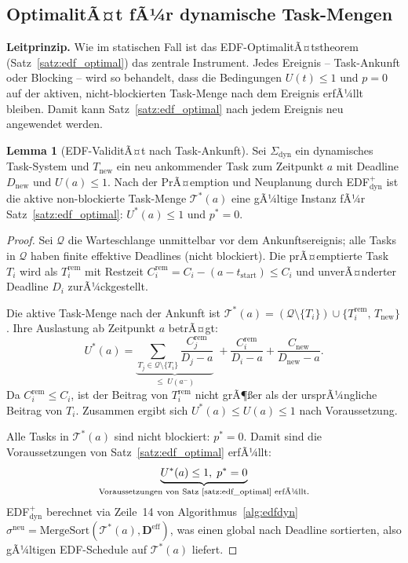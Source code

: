 ﻿\documentclass[a4paper,12pt]{article}
\theoremstyle{definition}
\newtheorem{lemma}{Lemma}
\begin{document}
	\subsection{OptimalitÃ¤t fÃ¼r dynamische Task-Mengen}

	\textbf{Leitprinzip.} Wie im statischen Fall ist das EDF-OptimalitÃ¤tstheorem
	(Satz~\ref{satz:edf_optimal}) das zentrale Instrument. Jedes Ereignis --
	Task-Ankunft oder Blocking -- wird so behandelt, dass die Bedingungen
	$U(t) \le 1$ und $p = 0$ auf der aktiven, nicht-blockierten Task-Menge
	nach dem Ereignis erfÃ¼llt bleiben. Damit kann Satz~\ref{satz:edf_optimal}
	nach jedem Ereignis neu angewendet werden.

	\begin{lemma}[EDF-ValiditÃ¤t nach Task-Ankunft]
		\label{lem:ankunft_konsistenz}
		Sei $\Sigma_{\mathrm{dyn}}$ ein dynamisches Task-System und $T_{\text{new}}$
		ein neu ankommender Task zum Zeitpunkt $a$ mit Deadline $D_{\text{new}}$
		und $U(a) \le 1$. Nach der PrÃ¤emption und Neuplanung durch
		EDF$^+_{\mathrm{dyn}}$ ist die aktive non-blockierte Task-Menge
		$\mathcal{T}^*(a)$ eine gÃ¼ltige Instanz fÃ¼r
		Satz~\ref{satz:edf_optimal}: $U^*(a) \le 1$ und $p^* = 0$.
	\end{lemma}

	\begin{proof}
		Sei $\mathcal{Q}$ die Warteschlange unmittelbar vor dem Ankunftsereignis;
		alle Tasks in $\mathcal{Q}$ haben finite effektive Deadlines (nicht blockiert).
		Die prÃ¤emptierte Task $T_i$ wird als $T_i^{\text{rem}}$ mit Restzeit
		$C_i^{\text{rem}} = C_i - (a - t_{\text{start}}) \le C_i$ und
		unverÃ¤nderter Deadline $D_i$ zurÃ¼ckgestellt.

		Die aktive Task-Menge nach der Ankunft ist
		$\mathcal{T}^*(a) = (\mathcal{Q} \setminus \{T_i\}) \cup \{T_i^{\text{rem}},\, T_{\text{new}}\}$.
		Ihre Auslastung ab Zeitpunkt $a$ betrÃ¤gt:
		\[
		U^*(a) = \underbrace{\sum_{T_j \in \mathcal{Q} \setminus \{T_i\}} \frac{C_j^{\text{rem}}}{D_j - a}}_{{\le}\; U(a^-)}\;
		+ \frac{C_i^{\text{rem}}}{D_i - a}
		+ \frac{C_{\text{new}}}{D_{\text{new}} - a}.
		\]
		Da $C_i^{\text{rem}} \le C_i$, ist der Beitrag von $T_i^{\text{rem}}$ nicht
		grÃ¶\ss{}er als der ursprÃ¼ngliche Beitrag von $T_i$. Zusammen ergibt sich
		$U^*(a) \le U(a) \le 1$ nach Voraussetzung.

		Alle Tasks in $\mathcal{T}^*(a)$ sind nicht blockiert: $p^* = 0$.
		Damit sind die Voraussetzungen von Satz~\ref{satz:edf_optimal} erfÃ¼llt:
		\[
		\underbrace{U^*(a) \le 1,\; p^* = 0}_{\text{Voraussetzungen von Satz~\ref{satz:edf_optimal} erfÃ¼llt.}}
		\]
		EDF$^+_{\mathrm{dyn}}$ berechnet via Zeile~14 von Algorithmus~\ref{alg:edfdyn}
		$\sigma^{\text{neu}} = \mathrm{MergeSort}(\mathcal{T}^*(a), \mathbf{D}^{\text{eff}})$,
		was einen global nach Deadline sortierten, also gÃ¼ltigen EDF-Schedule auf
		$\mathcal{T}^*(a)$ liefert.
	\end{proof}
\end{document}
